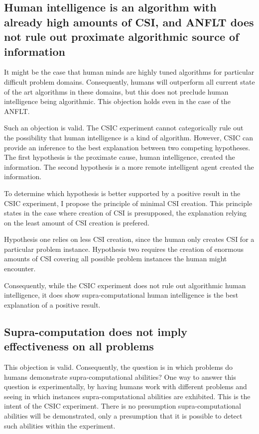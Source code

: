 \subsection{Human intelligence is an algorithm with already high amounts of CSI, and ANFLT does not rule out proximate algorithmic source of information}

 It might be the case that human minds are highly tuned algorithms for particular difficult problem domains.  Consequently, humans will outperform all current state of the art algorithms in these domains, but this does not preclude human intelligence being algorithmic.  This objection holds even in the case of the ANFLT.

 Such an objection is valid.  The CSIC experiment cannot categorically rule out the possibility that human intelligence is a kind of algorithm.  However, CSIC can provide an inference to the best explanation between two competing hypotheses.  The first hypothesis is the proximate cause, human intelligence, created the information.  The second hypothesis is a more remote intelligent agent created the information.

 To determine which hypothesis is better supported by a positive result in the CSIC experiment, I propose the principle of minimal CSI creation.  This principle states in the case where creation of CSI is presupposed, the explanation relying on the least amount of CSI creation is prefered.

 Hypothesis one relies on less CSI creation, since the human only creates CSI for a particular problem instance.  Hypothesis two requires the creation of enormous amounts of CSI covering all possible problem instances the human might encounter.

 Consequently, while the CSIC experiment does not rule out algorithmic human intelligence, it does show supra-computational human intelligence is the best explanation of a positive result. 

\subsection{Supra-computation does not imply effectiveness on all problems}
 This objection is valid.  Consequently, the question is in which problems do humans demonstrate supra-computational abilities?  One way to answer this question is experimentally, by having humans work with different problems and seeing in which instances supra-computational abilities are exhibited.  This is the intent of the CSIC experiment.  There is no presumption supra-computational abilities will be demonstrated, only a presumption that it is possible to detect such abilities within the experiment. 

